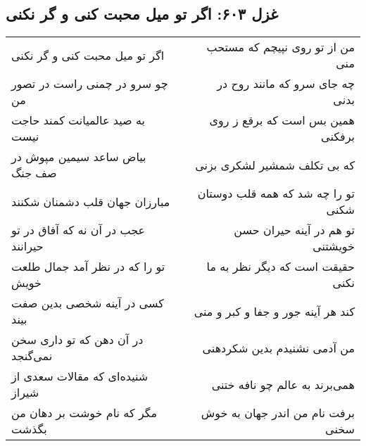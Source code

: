 \begin{center}
\section*{غزل ۶۰۳: اگر تو میل محبت کنی و گر نکنی}
\label{sec:603}
\begin{longtable}{l p{0.5cm} r}
اگر تو میل محبت کنی و گر نکنی
&&
من از تو روی نپیچم که مستحب منی
\\
چو سرو در چمنی راست در تصور من
&&
چه جای سرو که مانند روح در بدنی
\\
به صید عالمیانت کمند حاجت نیست
&&
همین بس است که برقع ز روی برفکنی
\\
بیاض ساعد سیمین مپوش در صف جنگ
&&
که بی تکلف شمشیر لشکری بزنی
\\
مبارزان جهان قلب دشمنان شکنند
&&
تو را چه شد که همه قلب دوستان شکنی
\\
عجب در آن نه که آفاق در تو حیرانند
&&
تو هم در آینه حیران حسن خویشتنی
\\
تو را که در نظر آمد جمال طلعت خویش
&&
حقیقت است که دیگر نظر به ما نکنی
\\
کسی در آینه شخصی بدین صفت بیند
&&
کند هر آینه جور و جفا و کبر و منی
\\
در آن دهن که تو داری سخن نمی‌گنجد
&&
من آدمی نشنیدم بدین شکردهنی
\\
شنیده‌ای که مقالات سعدی از شیراز
&&
همی‌برند به عالم چو نافه ختنی
\\
مگر که نام خوشت بر دهان من بگذشت
&&
برفت نام من اندر جهان به خوش سخنی
\\
\end{longtable}
\end{center}
